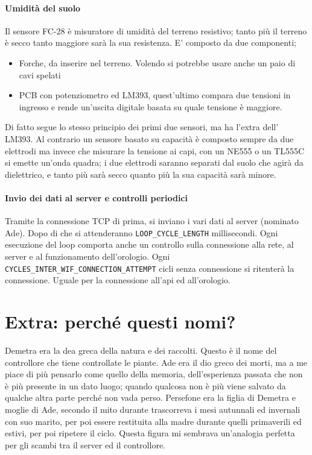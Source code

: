 \documentclass{article}
\begin{document}
    \paragraph{Umidità del suolo} Il sensore FC-28 è misuratore di umidità del terreno resistivo; tanto più il terreno è secco tanto maggiore sarà la sua resistenza. E' composto da due componenti;
    \begin{itemize}
        \item Forche, da inserire nel terreno. Volendo si potrebbe usare anche un paio di cavi spelati \\
        \item PCB con potenziometro ed LM393, quest'ultimo compara due tensioni in ingresso e rende un'uscita digitale basata su quale tensione è maggiore. 
    \end{itemize}
    Di fatto segue lo stesso principio dei primi due sensori, ma ha l'extra dell' LM393.
    Al contrario un sensore basato su capacità è composto sempre da due elettrodi ma invece che misurare la tensione ai capi, con un NE555 o un TL555C si emette un'onda quadra; i due elettrodi saranno separati dal suolo che agirà da dielettrico, e tanto più sarà secco quanto più la sua capacità sarà minore. 
    \paragraph{Invio dei dati al server e controlli periodici} Tramite la connessione TCP di prima, si inviano i vari dati al server (nominato Ade). Dopo di che si attenderanno \texttt{LOOP\_CYCLE\_LENGTH} millisecondi. Ogni esecuzione del loop comporta anche un controllo sulla connessione alla rete, al server e al funzionamento dell'orologio. Ogni \texttt{CYCLES\_INTER\_WIF\_CONNECTION\_ATTEMPT} cicli senza connessione si ritenterà la connessione. Uguale per la connessione all'api ed all'orologio.

    \section{Extra: perché questi nomi?}
    Demetra era la dea greca della natura e dei raccolti. Questo è il nome del controllore che tiene controllate le piante.
    Ade era il dio greco dei morti, ma a me piace di più pensarlo come quello della memoria, dell'esperienza passata che non è più presente in un dato luogo; quando qualcosa non è più viene salvato da qualche altra parte perché non vada perso.
    Persefone era la figlia di Demetra e moglie di Ade, secondo il mito durante trascorreva i mesi autunnali ed invernali con suo marito, per poi essere restituita alla madre durante quelli primaverili ed estivi, per poi ripetere il ciclo. Questa figura mi sembrava un'analogia perfetta per gli scambi tra il server ed il controllore.
\end{document}

